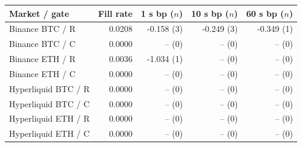 \begin{tabular}{lrrrr}
\toprule
Market / gate & Fill rate & 1 s bp ($n$) & 10 s bp ($n$) & 60 s bp ($n$) \\
\midrule
Binance BTC / R & 0.0208 & -0.158 (3) & -0.249 (3) & -0.349 (1) \\
Binance BTC / C & 0.0000 & -- (0) & -- (0) & -- (0) \\
Binance ETH / R & 0.0036 & -1.034 (1) & -- (0) & -- (0) \\
Binance ETH / C & 0.0000 & -- (0) & -- (0) & -- (0) \\
Hyperliquid BTC / R & 0.0000 & -- (0) & -- (0) & -- (0) \\
Hyperliquid BTC / C & 0.0000 & -- (0) & -- (0) & -- (0) \\
Hyperliquid ETH / R & 0.0000 & -- (0) & -- (0) & -- (0) \\
Hyperliquid ETH / C & 0.0000 & -- (0) & -- (0) & -- (0) \\
\bottomrule
\end{tabular}
